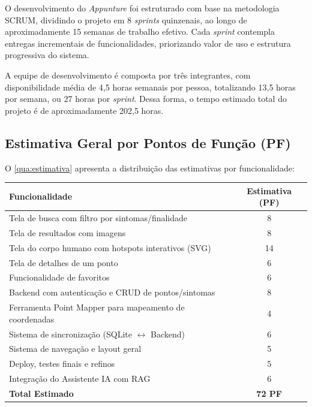 O desenvolvimento do \textit{Appunture} foi estruturado com base na metodologia SCRUM, dividindo o projeto em 8 \textit{sprints} quinzenais, ao longo de aproximadamente 15 semanas de trabalho efetivo. Cada \textit{sprint} contempla entregas incrementais de funcionalidades, priorizando valor de uso e estrutura progressiva do sistema.

A equipe de desenvolvimento é composta por três integrantes, com disponibilidade média de 4,5 horas semanais por pessoa, totalizando 13,5 horas por semana, ou 27 horas por \textit{sprint}. Dessa forma, o tempo estimado total do projeto é de aproximadamente 202,5 horas.

\subsection{Estimativa Geral por Pontos de Função (PF)}

O \autoref{qua:estimativa} apresenta a distribuição das estimativas por funcionalidade:

\begin{quadro}[htb]
\caption{Estimativa por Pontos de Função}
\label{qua:estimativa}
\centering
\begin{tabular}{|p{10cm}|c|}
\hline
\textbf{Funcionalidade} & \textbf{Estimativa (PF)} \\
\hline
Tela de busca com filtro por sintomas/finalidade & 8 \\
\hline
Tela de resultados com imagens & 8 \\
\hline
Tela do corpo humano com hotspots interativos (SVG) & 14 \\
\hline
Tela de detalhes de um ponto & 6 \\
\hline
Funcionalidade de favoritos & 6 \\
\hline
Backend com autenticação e CRUD de pontos/sintomas & 8 \\
\hline
Ferramenta Point Mapper para mapeamento de coordenadas & 4 \\
\hline
Sistema de sincronização (SQLite $\leftrightarrow$ Backend) & 6 \\
\hline
Sistema de navegação e layout geral & 5 \\
\hline
Deploy, testes finais e refinos & 5 \\
\hline
Integração do Assistente IA com RAG & 6 \\
\hline
\textbf{Total Estimado} & \textbf{72 PF} \\
\hline
\end{tabular}
\end{quadro}

